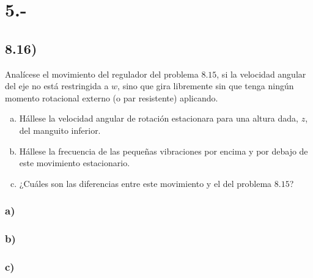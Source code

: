 \documentclass{article}
\begin{document}
\section*{5.-}
\subsection*{8.16)}
Analícese el movimiento del regulador del problema $8.15$, si la velocidad angular 
del eje no está restringida a $w$, sino que gira libremente sin que tenga ningún momento 
rotacional externo (o par resistente) aplicando. 
\begin{enumerate}[a)]
    \item Hállese la velocidad angular de rotación estacionara para una altura dada, $z$, 
    del manguito inferior.
    \item Hállese la frecuencia de las pequeñas vibraciones por encima y por debajo de este movimiento 
    estacionario. 
    \item ¿Cuáles son las diferencias entre este movimiento y el del problema $8.15$?
\end{enumerate}
\begin{tcolorbox}[breakable]
    \subsubsection*{a)}
    \subsubsection*{b)}
    \subsubsection*{c)}
\end{tcolorbox}
\end{document}
